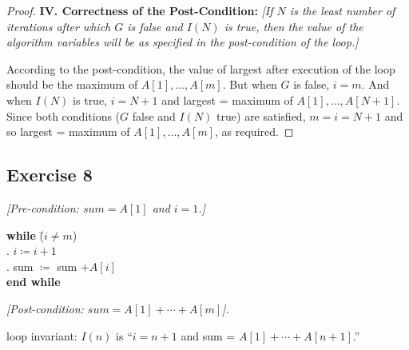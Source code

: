 \documentclass[14pt]{extarticle}
\begin{document}
\begin{proof}
{\bf IV. Correctness of the Post-Condition:} {\it [If $N$ is the least number of iterations after which $G$ is false 
and $I(N)$ is true, then the value of the algorithm variables will be as specified in the post-condition of the 
loop.]} 

According to the post-condition, the value of largest after execution of the loop should be the maximum of $A[1], \ldots, A[m]$. 
But when $G$ is false, $i = m$. And when $I(N)$ is true, $i = N+1$ and largest = maximum of $A[1], \ldots, A[N+1]$. 
Since both conditions ($G$ false and $I(N)$ true) are satisfied, $m = i = N+1$ and so largest = maximum of $A[1], \ldots, A[m]$, as required.
\end{proof}

\subsection{Exercise 8}
{\it [Pre-condition: $sum = A[1]$ and $i = 1$.]} 

\begin{tabbing}
{\bf while} \= ($i \neq m$) \\
            . $i \coloneqq i + 1$ \\
            . sum $\coloneqq$ sum $ + A[i]$ \\
{\bf end while}
\end{tabbing}

{\it [Post-condition: $sum = A[1] + \cdots + A[m]$].} 

loop invariant: $I(n)$ is ``$i = n + 1$ and sum = $A[1] + \cdots + A[n+1]$.''
\end{document}
